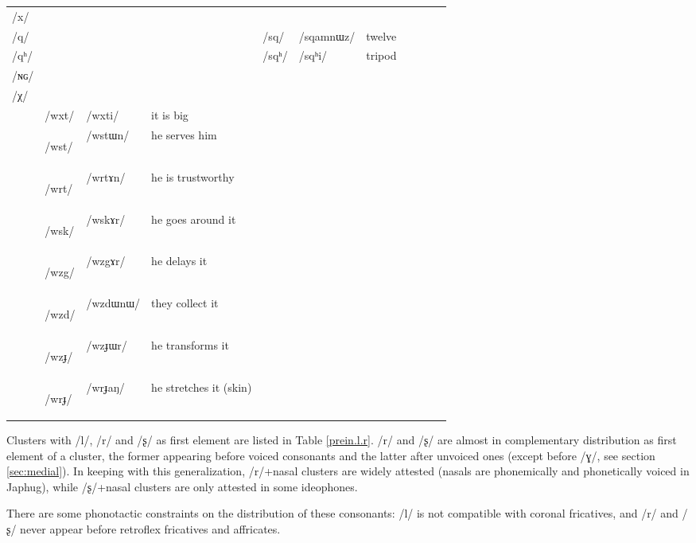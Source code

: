 \documentclass[oneside,a4paper,11pt]{article}
\newcommand{\ipa}[1]{\mbox{\phon/#1/}}
\newcommand{\deux}[1]{\ipa{#1}\addtocounter{2clusters}{1}}
\newcommand{\trois}[1]{\ipa{#1}\addtocounter{3clusters}{1}}
\newcommand{\tib}[1]{\cellcolor{lightgray}\textbf{#1}}
\newcommand{\resetcounters}[2]{
\newcounter{#1}
\newcounter{#2}
 \setcounter{#1}{\value{2clusters}}
  \setcounter{#2}{\value{3clusters}}
 \setcounter{2clusters}{0}
  \setcounter{3clusters}{0}
}
\begin{document}
\begin{landscape}
\begin{table}
\begin{tabular}{l|lll|lll|lll|l}
\ipa{x}  &	  &	  &	&	  &	  &	&	  &	  &	&	\\
\ipa{q}  &	  &	  &	&	\deux{sq}  &	\ipa{sqamnɯz}  &	twelve&	  &	  &	&	\\
\ipa{qʰ}  &	  &	  &	&	\deux{sqʰ}  &	\ipa{sqʰi}  &	tripod&	  &	  &	&	\\
\ipa{ɴɢ}  &	  &	  &	&	  &	  &	&	  &	  &	&	\\
\ipa{χ}  &	  &	  &	&	  &	  &	&	  &	  &	&	\\
\midrule
&	\trois{wxt}  &	\ipa{wxti}  &it is big	\\
&	\trois{wst} \tib{} &	\ipa{wstɯn}  &he serves him	\\
&	\trois{wrt}  \tib{} &	\ipa{wrtɤn}  &	he is trustworthy\\
&	\trois{wsk}  \tib{} &	\ipa{wskɤr}  & he goes around it	\\
&	\trois{wzg}  \tib{} &	\ipa{wzgɤr}  & he delays it	\\
&	\trois{wzd}  \tib{} &	\ipa{wzdɯnɯ}  & they collect it	\\
&	\trois{wzɟ}  \tib{} &	\ipa{wzɟɯr}  & he transforms it	\\
&	\trois{wrɟ}  \tib{} &	\ipa{wrɟaŋ}  &he stretches it (skin)	\\
\bottomrule
\end{tabular}%
\end{table}
 \end{landscape}
\resetcounters{2wszC}{3wszC} %
 Clusters with \ipa{l}, \ipa{r}  and \ipa{ʂ} as first element are listed in Table \ref{prein.l.r}. \ipa{r} and \ipa{ʂ} are almost in complementary distribution as first element of a cluster, the former appearing before voiced consonants and the latter after unvoiced ones (except before \ipa{ɣ}, see section \ref{sec:medial}). In keeping with this generalization, \ipa{r}+nasal clusters are widely attested (nasals are phonemically and phonetically voiced in Japhug),  while \ipa{ʂ}+nasal clusters are only attested in some ideophones.
 
 There are some phonotactic constraints on the distribution of these consonants: \ipa{l} is not compatible with coronal fricatives,  and \ipa{r} and \ipa{ʂ} never appear before retroflex fricatives and affricates.  
 
\end{document}
